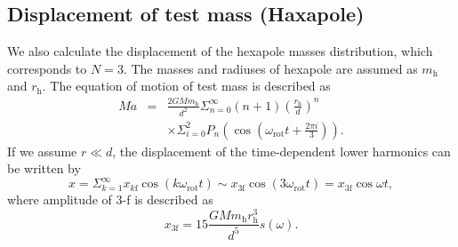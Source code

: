 \documentclass[%
 reprint,
superscriptaddress,
 amsmath,amssymb,
 aps,
]{revtex4-1}
\begin{document}
\subsection{Displacement of test mass (Haxapole)} \label{Hexa}
We also calculate the displacement of the hexapole masses distribution, which corresponds to $N=3$.
The masses and radiuses of hexapole are assumed as $m_{\mathrm{h}}$ and $r_{\mathrm{h}}$. 
The equation of motion of test mass is described as
\begin{eqnarray}
Ma &=& \frac{2GMm_{\mathrm{h}}}{d^2}\Sigma^{\infty}_{n=0}(n+1) \left( \frac{r_{\mathrm{h}}}{d} \right)^n \nonumber \\
&&\times \Sigma^2_{i=0} P_n \left(\cos{\left(\omega_{\mathrm{rot}} t+\frac{2\pi i}{3} \right)} \right).
\end{eqnarray} 
If we assume $r \ll d$, the displacement of the time-dependent lower harmonics can be written by 
\begin{equation}
x=\Sigma_{k=1}^{\infty}x_{k\mathrm{f}}\cos(k\omega_{\mathrm{rot}} t)\sim  x_{3\mathrm{f}}\cos(3\omega_{\mathrm{rot}} t)=x_{\mathrm{3f}}\cos{\omega t},
\end{equation}
where amplitude of 3-f is described as
\begin{equation}
 x_{3\mathrm{f}}=15\frac{GMm_{\mathrm{h}}r_{\mathrm{h}}^3}{d^5}s(\omega). \label{3f}
\end{equation}
\end{document}
